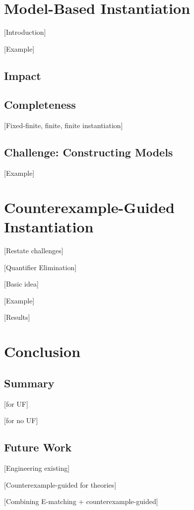 \documentclass[oribibl]{llncs}
\begin{document}
\section{Model-Based Instantiation}
\label{sec:mbqi}

[Introduction]

[Example]

\subsection{Impact}

\subsection{Completeness}

[Fixed-finite, finite, finite instantiation]

\subsection{Challenge: Constructing Models}

[Example]

\section{Counterexample-Guided Instantiation}
\label{sec:cegqi}

[Restate challenges]

[Quantifier Elimination]

[Basic idea]

[Example]

[Results]

\section{Conclusion}
\label{sec:conclusion}

\subsection{Summary}
[for UF]

[for no UF]

\subsection{Future Work}

[Engineering existing]

[Counterexample-guided for theories]

[Combining E-matching + counterexample-guided]



\end{document}
